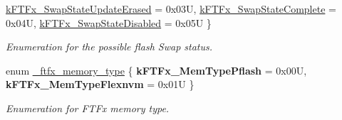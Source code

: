 \begin{DoxyCompactItemize}
\mbox{\hyperlink{group__ftfx__controller_ggac6715381632a07d502632b03f8cfb402af7479a28d299cd6e9239f0367ebcb0f6}{k\+F\+T\+Fx\+\_\+\+Swap\+State\+Update\+Erased}} = 0x03U, 
\newline
\mbox{\hyperlink{group__ftfx__controller_ggac6715381632a07d502632b03f8cfb402ab808523acebe2fad478d2a5136f3d782}{k\+F\+T\+Fx\+\_\+\+Swap\+State\+Complete}} = 0x04U, 
\mbox{\hyperlink{group__ftfx__controller_ggac6715381632a07d502632b03f8cfb402ac59f9257ba267cf49f52ce56aadd2bba}{k\+F\+T\+Fx\+\_\+\+Swap\+State\+Disabled}} = 0x05U
 \}
\begin{DoxyCompactList}\small\item\em Enumeration for the possible flash Swap status. \end{DoxyCompactList}\item 
\mbox{\label{group__ftfx__controller_gabc3ca923de8623881d88a193884562bb}} 
enum \mbox{\hyperlink{group__ftfx__controller_gabc3ca923de8623881d88a193884562bb}{\+\_\+ftfx\+\_\+memory\+\_\+type}} \{ {\bfseries k\+F\+T\+Fx\+\_\+\+Mem\+Type\+Pflash} = 0x00U, 
{\bfseries k\+F\+T\+Fx\+\_\+\+Mem\+Type\+Flexnvm} = 0x01U
 \}
\begin{DoxyCompactList}\small\item\em Enumeration for F\+T\+Fx memory type. \end{DoxyCompactList}\end{DoxyCompactItemize}
